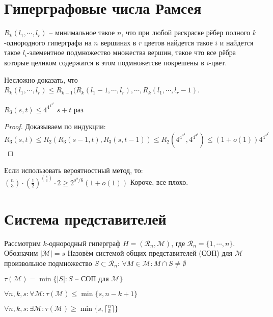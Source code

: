 \documentclass[document.tex]{subfiles}
\begin{document}
\section{Гиперграфовые числа Рамсея}
\begin{definition}
    $R_k(l_1, \cdots, l_r)$ -- минимальное такое $n$, что при любой раскраске рёбер полного $k$-однородного гиперграфа
    на $n$ вершинах в $r$ цветов найдется такое $i$ и найдется такое $l_i$-элементное подмножество множества вершин,
    такое что все рёбра которые целиком содержатся в этом подмножетсве покрешены в $i$-цвет.
\end{definition}

Несложно доказать, что $R_k(l_1, \cdots, l_r) \leq R_{k - 1}(R_k(l_1 - 1, \cdots, l_r), \cdots, R_k(l_1, \cdots, l_r -
1)$.

\begin{theorem}
    $R_3(s, t) \leq 4^{4^{4^{4^4}}}$ $s+t$ раз
\end{theorem}
\begin{proof}
    Доказываем по индукции: $R_3(s, t) \leq R_2(R_3(s - 1, t), R_3(s, t - 1)) \leq R_2(4^{4^{4^4}}, 4^{4^{4^4}}) \leq
    (1 + o(1)) 4^{4^{4^{4^4}}}$
\end{proof}
Если использовать вероятностный метод, то: $\binom{n}{3} \cdot (\frac{1}{2})^{\binom{s}{3}} \cdot 2 \geq 2^{s^2/6}(1 +
o(1))$
Короче, все плохо.

\section{Система представителей}

\begin{definition}
    Рассмотрим $k$-однородный гиперграф $H = (\mathcal{R}_n, \mathcal{M})$, где $\mathcal{R}_n = \{1, \cdots, n\}$.
    Обозначим $|\mathcal{M}| = s$
    Назовём системой общих представителей (СОП) для $\mathcal{M}$ произвольное подмножество $S \subset \mathcal{R}_n$: $\forall M \in
    \mathcal{M}: M \cap S \neq \emptyset$

    $\tau(\mathcal{M}) = \min \{|S|: S \text{ -- СОП для $\mathcal{M}$}\}$
\end{definition}

\begin{statement}
    $\forall n, k, s: \forall \mathcal{M}: \tau(\mathcal{M}) \leq \min \{s, n - k + 1\}$
\end{statement}

\begin{statement}
    $\forall n, k, s: \exists \mathcal{M}: \tau(\mathcal{M}) \geq \min \{s, \lceil \frac{n}{k} \rceil\}$
\end{statement}
\end{document}
